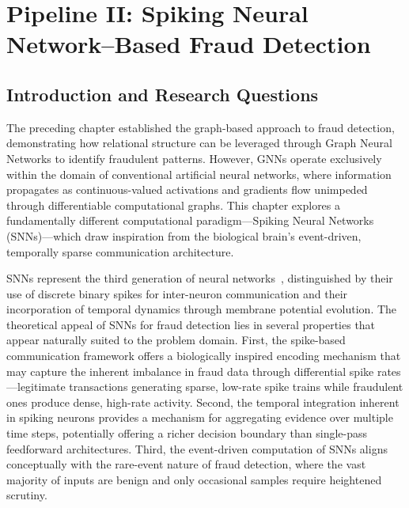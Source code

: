 \chapter{Pipeline II: Spiking Neural Network--Based Fraud Detection}
\label{ch:snn}

\section{Introduction and Research Questions}

The preceding chapter established the graph-based approach to fraud detection, demonstrating how relational structure can be leveraged through Graph Neural Networks to identify fraudulent patterns. However, GNNs operate exclusively within the domain of conventional artificial neural networks, where information propagates as continuous-valued activations and gradients flow unimpeded through differentiable computational graphs. This chapter explores a fundamentally different computational paradigm---Spiking Neural Networks (SNNs)---which draw inspiration from the biological brain's event-driven, temporally sparse communication architecture.

SNNs represent the third generation of neural networks~\cite{maass1997networks}, distinguished by their use of discrete binary spikes for inter-neuron communication and their incorporation of temporal dynamics through membrane potential evolution. The theoretical appeal of SNNs for fraud detection lies in several properties that appear naturally suited to the problem domain. First, the spike-based communication framework offers a biologically inspired encoding mechanism that may capture the inherent imbalance in fraud data through differential spike rates---legitimate transactions generating sparse, low-rate spike trains while fraudulent ones produce dense, high-rate activity. Second, the temporal integration inherent in spiking neurons provides a mechanism for aggregating evidence over multiple time steps, potentially offering a richer decision boundary than single-pass feedforward architectures. Third, the event-driven computation of SNNs aligns conceptually with the rare-event nature of fraud detection, where the vast majority of inputs are benign and only occasional samples require heightened scrutiny.

